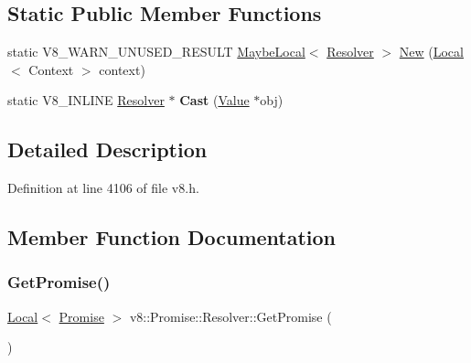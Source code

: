 \subsection*{Static Public Member Functions}
\begin{DoxyCompactItemize}
\item 
static V8\+\_\+\+W\+A\+R\+N\+\_\+\+U\+N\+U\+S\+E\+D\+\_\+\+R\+E\+S\+U\+LT \mbox{\hyperlink{classv8_1_1MaybeLocal}{Maybe\+Local}}$<$ \mbox{\hyperlink{classv8_1_1Promise_1_1Resolver}{Resolver}} $>$ \mbox{\hyperlink{classv8_1_1Promise_1_1Resolver_a39d73fbb8db9bb44de553674e2d39409}{New}} (\mbox{\hyperlink{classv8_1_1Local}{Local}}$<$ Context $>$ context)
\item 
\mbox{\label{classv8_1_1Promise_1_1Resolver_ab2b541cb210158ed0c757c8b7dc46279}} 
static V8\+\_\+\+I\+N\+L\+I\+NE \mbox{\hyperlink{classv8_1_1Promise_1_1Resolver}{Resolver}} $\ast$ {\bfseries Cast} (\mbox{\hyperlink{classv8_1_1Value}{Value}} $\ast$obj)
\end{DoxyCompactItemize}


\subsection{Detailed Description}


Definition at line 4106 of file v8.\+h.



\subsection{Member Function Documentation}
\mbox{\label{classv8_1_1Promise_1_1Resolver_a6f2f1c4d0d44d5c9cbf45404391fe83c}} 
\subsubsection{\texorpdfstring{Get\+Promise()}{GetPromise()}}
{\footnotesize\ttfamily \mbox{\hyperlink{classv8_1_1Local}{Local}}$<$ \mbox{\hyperlink{classv8_1_1Promise}{Promise}} $>$ v8\+::\+Promise\+::\+Resolver\+::\+Get\+Promise (\begin{DoxyParamCaption}{ }\end{DoxyParamCaption})}

